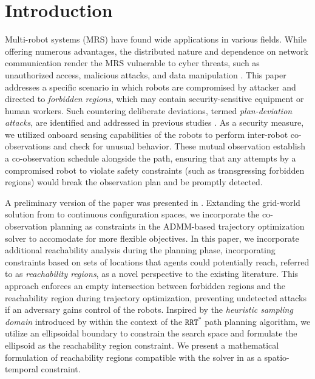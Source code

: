 \documentclass[10pt,twocolumn,twoside]{IEEEtran}
\begin{document}
\section{Introduction}\label{sec:introduction}
Multi-robot systems (MRS) have found wide applications in various fields. While offering numerous advantages, the distributed nature and dependence on network communication render the MRS vulnerable to cyber threats, such as unauthorized access, malicious attacks, and data manipulation \cite{brunner2010infiltrating}. This paper addresses a specific scenario in which  robots are compromised by attacker and directed to \emph{forbidden regions}, which may contain security-sensitive equipment or human workers. Such countering deliberate deviations, termed \emph{plan-deviation attacks}, are identified and addressed in previous studies \cite{wardega2019resilience, wardega2023byzantine, wardega2023hola, yang2021multi, yang2020multi}. As a security measure, we utilized onboard sensing capabilities of the robots to perform inter-robot co-observations and check for unusual behavior. These mutual observation establish a co-observation schedule alongside the path, ensuring that any attempts by a compromised robot to violate safety constraints (such as transgressing forbidden regions) would break the observation plan and be promptly detected.

A preliminary version of the paper was presented in \cite{yang2020multi,yang2021multi}. Extanding the grid-world solution from \cite{wardega2019resilience} to continuous configuration spaces, we incorporate the co-observation planning as constraints in the ADMM-based trajectory optimization solver to accomodate for more flexible objectives. In this paper, we incorporate additional reachability analysis during the planning phase, incorporating constraints based on sets of locations that agents could potentially reach, referred to as \emph{reachability regions}, as a novel perspective to the existing literature. This approach enforces an empty intersection between forbidden regions and the reachability region during trajectory optimization, preventing undetected attacks if an adversary gains control of the robots. Inspired by the \emph{heuristic sampling domain} introduced by \cite{gammell2014informed} within the context of the $\mathtt{RRT^*}$ path planning algorithm, we utilize an ellipsoidal boundary to constrain the search space and formulate the ellipsoid as the reachability region constraint. We present a mathematical formulation of reachability regions compatible with the solver in \cite{yang2020multi} as a spatio-temporal constraint. 
\end{document}
